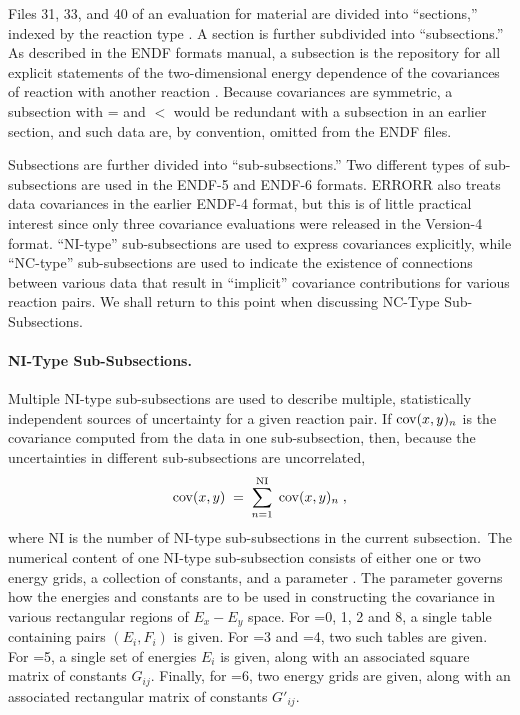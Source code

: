 Files 31, 33, and 40 of an evaluation for material  are divided
into ``sections,'' indexed by the reaction type .  A section
 is further subdivided into ``subsections.''  As
described in the ENDF formats manual, a subsection is the repository
for all explicit statements of the two-dimensional energy dependence
of the covariances of reaction  with another reaction
.  Because covariances are symmetric, a subsection
with = and $<$ would be
redundant with a subsection in an earlier section, and such data are,
by convention, omitted from the ENDF files.

Subsections are further divided into ``sub-subsections.''  Two different
types of sub-subsections are used in the ENDF-5 and ENDF-6 formats.  ERRORR
also treats data covariances in the earlier
ENDF-4 format, but this is of little practical interest since only three
covariance evaluations were released in the Version-4 format.  ``NI-type''
sub-subsections are used to express covariances explicitly, while
``NC-type'' sub-subsections are used to indicate the existence of
connections between various data that result in ``implicit'' covariance
contributions for various reaction pairs.  We shall return to this
point when discussing NC-Type Sub-Subsections.

\paragraph{NI-Type Sub-Subsections.} Multiple NI-type sub-subsections
are used to describe multiple, statistically independent sources of
uncertainty for a given reaction pair.  If $ {\rm cov}(x,y)_n$ is the
covariance computed from the data in one sub-subsection, then, because
the uncertainties in different sub-subsections are uncorrelated,
$$
{\rm cov}(x,y) \;= \; \sum^{{\rm NI}}_{n=1} \; {\rm cov}(x,y)_n \; ,
$$
\vspace{2 pt}
where NI is the number of NI-type sub-subsections in the current
subsection.\ The numerical content of one NI-type sub-subsection
consists of either one or two energy grids, a collection of constants,
and a parameter .  The parameter  governs how the
energies and constants are to be used in constructing the covariance in
various rectangular regions of $E_x {-}E_y$ space.  For =0, 1,
2 and 8, a single table containing pairs $(E_i,F_i)$ is
given.  For =3 and =4, two such tables are given.  For
=5,  a single set of energies $E_i$ is given, along with an
associated square matrix of constants $G_{ij}$.  Finally, for
=6, two energy grids are given, along with an associated
rectangular matrix of constants $G'_{ij}$.

